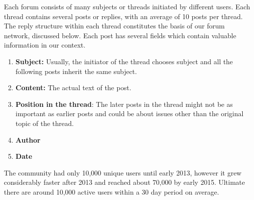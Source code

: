 Each forum consists of many subjects or threads initiated by different users.
Each thread contains several posts or replies, with an average of 10 posts per
thread.  The reply structure within each thread constitutes the basis of our
forum network, discussed below.  Each post has several fields which contain
valuable information in our context.
\begin{enumerate}[topsep=0pt,itemsep=-0.5ex,partopsep=1ex,parsep=1ex]
  \item \textbf{Subject:} Usually, the initiator of the thread chooses subject and all the
    following posts inherit the same subject.
  \item \textbf{Content:} The actual text of the post.
  \item \textbf{Position in the thread}: The later posts in the thread might not be as important
    as earlier posts and could be about issues other than the original topic of the thread.
  \item \textbf{Author}
  \item \textbf{Date}
\end{enumerate}
The community had only 10,000 unique users until early 2013, however it grew considerably faster after 2013 and reached about 70,000 by early 2015.
Ultimate there are around 10,000 active users within a 30 day period on average.
